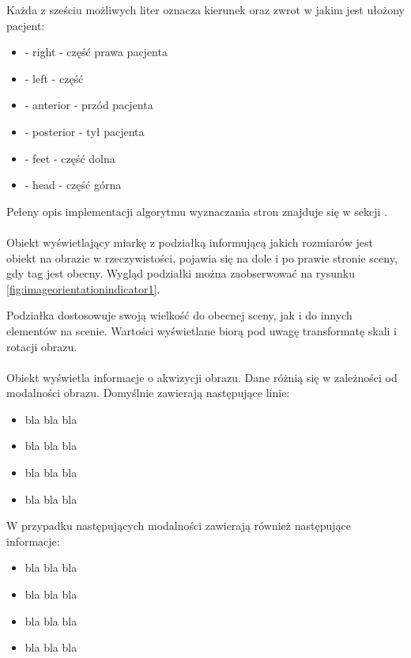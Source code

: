 \par
Każda z sześciu możliwych liter oznacza kierunek oraz zwrot w jakim jest ułożony pacjent:
\begin{itemize}
    \item {} - right - część prawa pacjenta
    \item {} - left - część
    \item {} - anterior - przód pacjenta
    \item {} - posterior - tył pacjenta
    \item {} - feet - część dolna
    \item {} - head - część górna
\end{itemize}

\par
Pełeny opis implementacji algorytmu wyznaczania stron znajduje się w sekcji \label{sec:algorithm-imageorientationindicator}.

\paragraph{}

Obiekt wyświetlający miarkę z podziałką informującą jakich rozmiarów jest obiekt na obrazie w rzeczywistości, pojawia się na dole i po prawie stronie sceny, gdy tag  jest obecny.
Wygląd podziałki można zaobserwować na rysunku \ref{fig:imageorientationindicator1}.

Podziałka dostosowuje swoją wielkość do obecnej sceny, jak i do innych elementów na scenie.
Wartości wyświetlane biorą pod uwagę transformatę skali i rotacji obrazu.

\paragraph{}

Obiekt wyświetla informacje o akwizycji obrazu.
Dane różnią się w zależności od modalności obrazu.
Domyślnie zawierają następujące linie:
\begin{itemize}
    \item bla bla bla
    \item bla bla bla
    \item bla bla bla
    \item bla bla bla
\end{itemize}

W przypadku następujących modalności zawierają również następujące informacje:
\begin{itemize}
    \item bla bla bla
    \item bla bla bla
    \item bla bla bla
    \item bla bla bla
\end{itemize}
